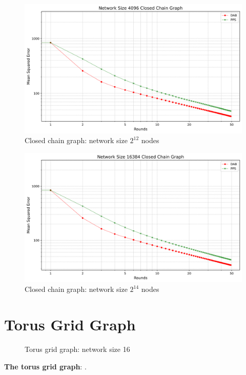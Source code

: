 \begin{figure}[H]
    \centering
    \includegraphics[scale=0.5]{figures/closedChainSimulations/DAB_vs_PPS_CCG_r50_n4096.png}
    \caption{Closed chain graph: network size $2^{12}$ nodes}
    \label{fig:4096ChainGraph}
\end{figure}

\begin{figure}[H]
    \centering
    \includegraphics[scale=0.5]{figures/closedChainSimulations/DAB_vs_PPS_CCG_r50_n16384.png}
    \caption{Closed chain graph: network size $2^{14}$ nodes}
    \label{fig:16384ChainGraph}
\end{figure}

\section{Torus Grid Graph}
\begin{figure}
    \centering
    \scalebox{1.5}{}
    \caption{Torus grid graph: network size 16}
    \label{fig:torusGraphDemo}
\end{figure}
\textbf{The torus grid graph}: \cite{PasdeloupTranslationOnGraphs2017}.
